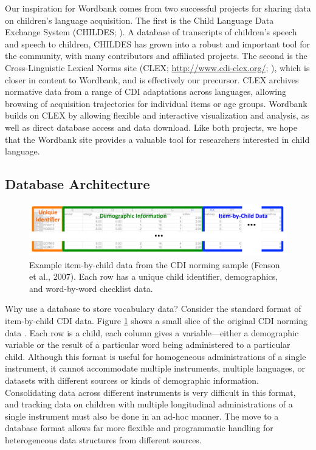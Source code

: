 \documentclass[doc,noapacite]{apa2}
\newcommand{\comment}[1]{\marginpar[]{\small \textcolor{blue}{#1}}}
\begin{document}
Our inspiration for Wordbank comes from two successful projects for sharing data on children's language acquisition. The first is the Child Language Data Exchange System (CHILDES; ). A database of transcripts of children's speech and speech to children, CHILDES has grown into a robust and important tool for the community, with many contributors and affiliated projects. The second is the Cross-Linguistic Lexical Norms site (CLEX; \url{http://www.cdi-clex.org/}; ), which is closer in content to Wordbank, and is effectively our precursor. CLEX archives normative data from a range of CDI adaptations across languages, allowing browsing of acquisition trajectories for individual items or age groups. Wordbank builds on CLEX by allowing flexible and interactive visualization and analysis, as well as direct database access and data download. \comment{Not sure how to structure this bit so as to acknowledge debt but highlight differences.} Like both projects, we hope that the Wordbank site provides a valuable tool for researchers interested in child language. 



\subsection{Database Architecture}

\begin{figure}[t]
\centering
\includegraphics[width=5in]{figures/itembychild.pdf}
\caption{\label{fig:data} Example item-by-child data from the CDI norming sample (Fenson et al., 2007). Each row has a unique child identifier, demographics, and word-by-word checklist data. }
\end{figure}

Why use a database to store vocabulary data? Consider the standard format of item-by-child CDI data. Figure \ref{fig:data} shows a small slice of the original CDI norming data \cite{fenson1994,fenson2007}. Each row is a child, each column gives a variable---either a demographic variable or the result of a particular word being administered to a particular child. Although this format is useful for homogeneous administrations of a single instrument, it cannot accommodate multiple instruments, multiple languages, or datasets with different sources or kinds of demographic information. Consolidating data across different instruments is very difficult in this format, and tracking data on children with multiple longitudinal administrations of a single instrument must also be done in an ad-hoc manner. The move to a database format allows far more flexible and programmatic handling for heterogeneous data structures from different sources. 
\end{document}
